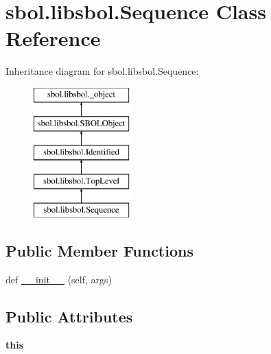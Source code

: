 \hypertarget{classsbol_1_1libsbol_1_1_sequence}{}\section{sbol.\+libsbol.\+Sequence Class Reference}
\label{classsbol_1_1libsbol_1_1_sequence}
Inheritance diagram for sbol.\+libsbol.\+Sequence\+:\begin{figure}[H]
\begin{center}
\leavevmode
\includegraphics[height=5.000000cm]{classsbol_1_1libsbol_1_1_sequence}
\end{center}
\end{figure}
\subsection*{Public Member Functions}
\begin{DoxyCompactItemize}
\item 
def \hyperlink{classsbol_1_1libsbol_1_1_sequence_ac6d617b37f202f81698b1e83a8e9a03e}{\+\_\+\+\_\+init\+\_\+\+\_\+} (self, args)
\end{DoxyCompactItemize}
\subsection*{Public Attributes}
\begin{DoxyCompactItemize}
\item 
{\bfseries this}\hypertarget{classsbol_1_1libsbol_1_1_sequence_aee1ca0c7cf023dc44e072f39247094a0}{}\label{classsbol_1_1libsbol_1_1_sequence_aee1ca0c7cf023dc44e072f39247094a0}

\end{DoxyCompactItemize}

